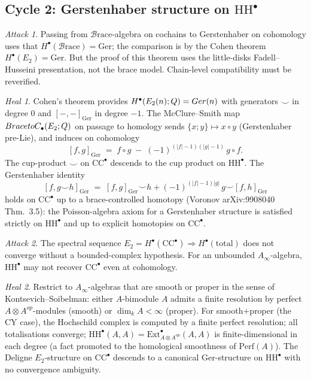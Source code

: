 \documentclass[11pt]{article}
\theoremstyle{definition}
\theoremstyle{remark}
\newtheorem*{attack}{Attack}
\newtheorem*{heal}{Heal}
\newcommand{\CC}{\mathrm{CC}}
\newcommand{\HH}{\mathrm{HH}}
\newcommand{\Br}{\mathcal{B}\mathrm{race}}
\newcommand{\Ger}{\mathrm{Ger}}
\newcommand{\Ainf}{A_{\infty}}
\begin{document}
\subsection*{Cycle 2: Gerstenhaber structure on $\HH^\bullet$}

\begin{attack}
Passing from $\Br$-algebra on cochains to Gerstenhaber on cohomology
uses that $H^\bullet(\Br) = \Ger$; the comparison is by the Cohen
theorem $H^\bullet(E_2) = \Ger$. But the proof of this theorem uses
the little-disks Fadell--Husseini presentation, not the brace model.
Chain-level compatibility must be reverified.
\end{attack}

\begin{heal}
Cohen's theorem provides $H^\bullet(E_2(n);\Q) = \Ger(n)$ with
generators $\smile$ in degree $0$ and $[-,-]_\Ger$ in degree $-1$.
The McClure--Smith map $\Br \to C_\bullet(E_2;\Q)$ on passage to
homology sends $\{x; y\} \mapsto x \circ y$ (Gerstenhaber pre-Lie),
and induces on cohomology
\[
 [f, g]_\Ger \;=\; f \circ g \;-\; (-1)^{(|f|-1)(|g|-1)}\, g \circ f.
\]
The cup-product $\smile$ on $\CC^\bullet$ descends to the cup product
on $\HH^\bullet$. The Gerstenhaber identity
\[
 [f, g \smile h]_\Ger \;=\; [f, g]_\Ger \smile h
 + (-1)^{(|f|-1)|g|}\, g \smile [f, h]_\Ger
\]
holds on $\CC^\bullet$ up to a brace-controlled homotopy (Voronov
arXiv:9908040 Thm.~3.5): the Poisson-algebra axiom for a
Gerstenhaber structure is satisfied strictly on $\HH^\bullet$ and
up to explicit homotopies on $\CC^\bullet$.
\end{heal}

\begin{attack}
The spectral sequence
$E_2 = H^\bullet(\CC^\bullet) \Rightarrow H^\bullet(\text{total})$
does not converge without a bounded-complex hypothesis. For an
unbounded $\Ainf$-algebra, $\HH^\bullet$ may not recover
$\CC^\bullet$ even at cohomology.
\end{attack}

\begin{heal}
Restrict to $\Ainf$-algebras that are smooth or proper in the sense
of Kontsevich--Soibelman: either $A$-bimodule $A$ admits a finite
resolution by perfect $A \otimes A^{op}$-modules (smooth) or
$\dim_k A < \infty$ (proper). For smooth+proper (the CY case), the
Hochschild complex is computed by a finite perfect resolution; all
totalisations converge; $\HH^\bullet(A,A) = \mathrm{Ext}^\bullet_{A
\otimes A^{op}}(A,A)$ is finite-dimensional in each degree (a fact
promoted to the homological smoothness of $\mathrm{Perf}(A)$). The
Deligne $E_2$-structure on $\CC^\bullet$ descends to a canonical
$\Ger$-structure on $\HH^\bullet$ with no convergence ambiguity.
\end{heal}
\end{document}
